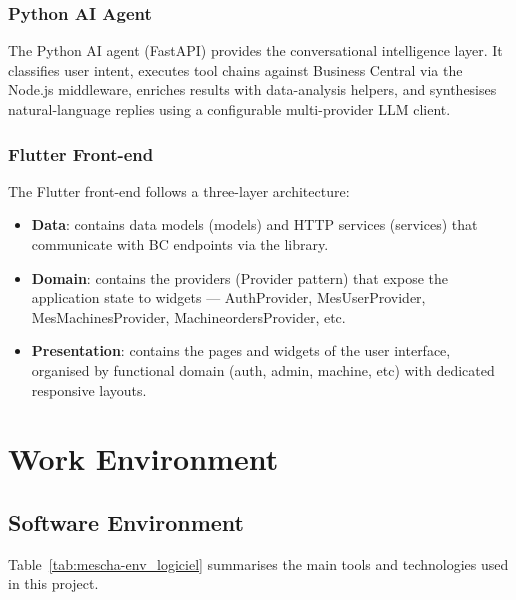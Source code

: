 \subsubsection*{Python AI Agent}

The Python AI agent (FastAPI) provides the conversational intelligence layer.
It classifies user intent, executes tool chains against Business Central via
the Node.js middleware, enriches results with data-analysis helpers, and
synthesises natural-language replies using a configurable multi-provider LLM client.


\subsubsection*{Flutter Front-end}

The Flutter front-end follows a three-layer architecture:

\begin{itemize}
	\item \textbf{Data}: contains data models (models) and HTTP services (services) that
	      communicate with BC endpoints via the  library.
	\item \textbf{Domain}: contains the providers (Provider pattern) that expose the
	      application state to widgets --- AuthProvider, MesUserProvider,
	      MesMachinesProvider, MachineordersProvider, etc.
	\item \textbf{Presentation}: contains the pages and widgets of the user interface,
	      organised by functional domain (auth, admin, machine, etc) with dedicated responsive
	      layouts.
\end{itemize}

\section{Work Environment}

\subsection{Software Environment}

Table~\ref{tab:mescha-env_logiciel} summarises the main tools and technologies used in
this project.

